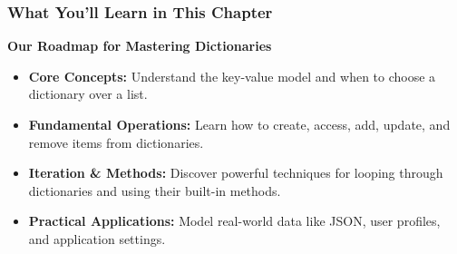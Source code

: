 \documentclass{beamer}
\begin{document}
\begin{frame}[fragile]
    \frametitle{What You'll Learn in This Chapter}

    \begin{center}
        \large\textbf{Our Roadmap for Mastering Dictionaries}
    \end{center}
    \vfill

    \begin{itemize}
        \item \textbf{Core Concepts:} Understand the key-value model and when to choose a dictionary over a list.
        \vspace{1em}
        
        \item \textbf{Fundamental Operations:} Learn how to create, access, add, update, and remove items from dictionaries.
        \vspace{1em}
        
        \item \textbf{Iteration \& Methods:} Discover powerful techniques for looping through dictionaries and using their built-in methods.
        \vspace{1em}
        
        \item \textbf{Practical Applications:} Model real-world data like JSON, user profiles, and application settings.
    \end{itemize}
    
    \vfill
\end{frame}
\end{document}
